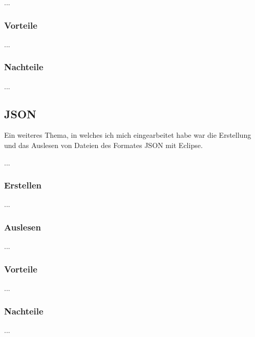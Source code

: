 \documentclass[12pt,a4paper,bibliography=totocnumbered,listof=totocnumbered]{scrartcl}
\begin{document}
...

\subsubsection{Vorteile}
...
\subsubsection{Nachteile}
...

\subsection{JSON}
Ein weiteres Thema, in welches ich mich eingearbeitet habe war die Erstellung und das Auslesen von Dateien
des Formates JSON mit Eclipse.

...

\subsubsection{Erstellen}
...
\subsubsection{Auslesen}
...
\subsubsection{Vorteile}
...
\subsubsection{Nachteile}
...
\end{document}
